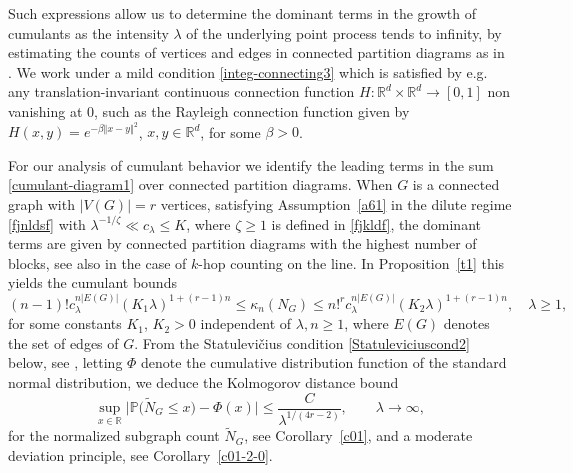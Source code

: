 \documentclass[12pt]{article}
\def\real{{\mathord{\mathbb R}}}
\def\P{\mathbb{P}}
\numberwithin{equation}{section}
\begin{document}
\medskip 
 
 Such expressions allow us to determine the dominant terms in the growth of
 cumulants as the intensity $\lambda$ of the underlying point process tends to infinity,
 by estimating the counts of vertices and edges in connected partition diagrams
 as in \cite{khorunzhiy}. 
 We work under a mild condition \eqref{integ-connecting3} 
 which is satisfied by e.g. any translation-invariant
 continuous connection function $H : \real^d\times \real^d \to [0,1]$ non vanishing at $0$, such as the {Rayleigh} connection function
  given by $H(x,y) = e^{ - \beta \Vert x - y\Vert^2}$, $x,y\in \real^d$, for some $\beta > 0$. 
 
\medskip 
 
 For our analysis of cumulant behavior
 we identify the leading terms in the sum \eqref{cumulant-diagram1}
 over connected partition diagrams. 
 When $G$ is a connected graph with $|V(G)|=r$ vertices,
 satisfying
 Assumption~\ref{a61} in the dilute regime \eqref{fjnldsf}
 with $\lambda^{-1/\zeta } \ll c_\lambda \leq K$,
 where $\zeta \geq 1$ is defined in \eqref{fjkldf}, 
 the dominant terms are given by connected partition diagrams with the
 highest number of blocks, 
 see also \cite{privaultkhops}
 in the case of $k$-hop counting on the line.
 In Proposition~\ref{t1} this yields the cumulant bounds 
$$
 (n-1)! c_\lambda^{n |E(G)| } ( K_1 \lambda )^{1+(r-1)n} 
 \leq 
  \kappa_n(N_G)
\leq 
n!^r c_\lambda^{n |E(G) |} ( K_2 \lambda )^{1+(r-1)n},
\quad \lambda \geq 1, 
$$
for some constants $K_1$, $K_2>0$ independent of $\lambda, n\geq 1$,
where $E(G)$ denotes the set of edges of $G$.
 From the {Statulevi\v{c}ius condition}
 \eqref{Statuleviciuscond2} below, see \cite{rudzkis,doering},
 letting $\Phi$ denote the cumulative distribution function of the standard normal distribution, 
 we deduce the Kolmogorov distance bound 
$$
\sup_{x\in \real}
\big| \P \big( \widetilde{N}_G \leq x \big) - \Phi (x) \big| \leq
\frac{C }{\lambda^{1/(4r - 2)}},
\qquad \lambda \to \infty, 
$$ 
 for the normalized subgraph count $\widetilde{N}_G$, 
see Corollary~\ref{c01}, and a moderate deviation principle, 
 see Corollary~\ref{c01-2-0}. 
  
\medskip
\end{document}
